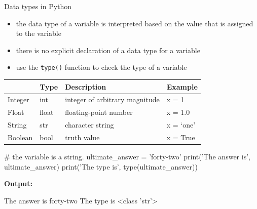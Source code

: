 \documentclass[
  american,
  ignorenonframetext,
]{beamer}
\newenvironment{pyexec}[1]{\noindent \textbf{Output: }  #1}{}
\begin{document}
\begin{frame}{Data types in Python}
\protect\hypertarget{data-types-in-python}{}

\begin{itemize}
\item
  the data type of a variable is interpreted based on the value that is
  assigned to the variable
\item
  there is no explicit declaration of a data type for a variable
\item
  use the \texttt{type()} function to check the type of a variable
  \vspace{2em}
\end{itemize}

\begin{longtable}[]{@{}llll@{}}
\toprule
& Type & Description & Example\tabularnewline
\midrule
\endhead
Integer & int & integer of arbitrary magnitude & x = 1\tabularnewline
Float & float & floating-point number & x = 1.0\tabularnewline
String & str & character string & x = `one'\tabularnewline
Boolean & bool & truth value & x = True\tabularnewline
\bottomrule
\end{longtable}


\end{frame}

\begin{frame}{}
\protect\hypertarget{section-1}{}

\begin{pythoncode}

# the variable is a string.
ultimate_answer = 'forty-two'
print('The answer is', ultimate_answer)
print('The type is', type(ultimate_answer))

\end{pythoncode}

\begin{pyexec}

\begin{outputcode}

The answer is forty-two
The type is <class 'str'>

\end{outputcode}

\end{pyexec}

\end{frame}
\end{document}
